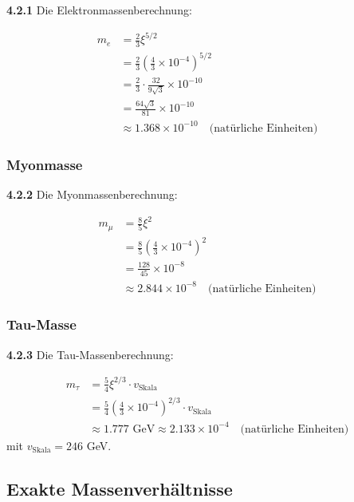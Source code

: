 \documentclass[12pt,a4paper]{article}
\newcommand{\xipar}{\xi}
\begin{document}
	\noindent \textbf{4.2.1} Die Elektronmassenberechnung:
	\begin{keyresult}
		\begin{align}
			m_e &= \frac{2}{3} \xipar^{5/2} \\
			&= \frac{2}{3} \left( \frac{4}{3} \times 10^{-4} \right)^{5/2} \\
			&= \frac{2}{3} \cdot \frac{32}{9 \sqrt{3}} \times 10^{-10} \\
			&= \frac{64 \sqrt{3}}{81} \times 10^{-10} \\
			&\approx 1.368 \times 10^{-10} \quad \text{(natürliche Einheiten)}
		\end{align}
	\end{keyresult}
	
	\subsubsection{Myonmasse}
	
	\noindent \textbf{4.2.2} Die Myonmassenberechnung:
	\begin{keyresult}
		\begin{align}
			m_\mu &= \frac{8}{5} \xipar^{2} \\
			&= \frac{8}{5} \left( \frac{4}{3} \times 10^{-4} \right)^{2} \\
			&= \frac{128}{45} \times 10^{-8} \\
			&\approx 2.844 \times 10^{-8} \quad \text{(natürliche Einheiten)}
		\end{align}
	\end{keyresult}
	
	\subsubsection{Tau-Masse}
	
	\noindent \textbf{4.2.3} Die Tau-Massenberechnung:
	\begin{keyresult}
		\begin{align}
			m_\tau &= \frac{5}{4} \xipar^{2/3} \cdot v_{\text{Skala}} \\
			&= \frac{5}{4} \left( \frac{4}{3} \times 10^{-4} \right)^{2/3} \cdot v_{\text{Skala}} \\
			&\approx 1.777 \text{ GeV} \approx 2.133 \times 10^{-4} \quad \text{(natürliche Einheiten)}
		\end{align}
		mit $v_{\text{Skala}} = 246$ GeV.
	\end{keyresult}
	
	\subsection{Exakte Massenverhältnisse}
	
\end{document}
